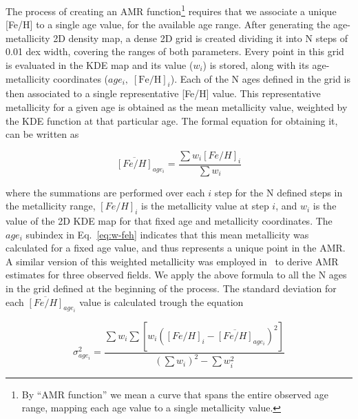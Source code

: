 \documentclass[draft]{aa}
\begin{document}
\begin{appendix}
The process of creating an AMR function\footnote{By ``AMR function'' we mean a
curve that spans the entire observed age range, mapping each age value
to a single metallicity value.} requires that we associate a unique [Fe/H] to a
single age value, for the available age range.
%
After generating the age-metallicity 2D density map, a dense 2D grid is created
dividing it into N steps of 0.01 dex width, covering the ranges of both
parameters. Every point in this grid is evaluated in the KDE map and its value 
($w_{i}$) is stored, along with its age-metallicity coordinates
($age_{i},\;[\mathrm{Fe/H}]_{i}$).
Each of the N ages defined in the grid is then associated to a single
representative [Fe/H] value. This representative metallicity for a given age is
obtained as the mean metallicity value, weighted by the KDE function at that
particular age. The formal equation for obtaining it, can be written as

\begin{equation}
\overline{[Fe/H]}_{age_i}=\frac{\sum w_i {[Fe/H]}_i}{\sum w_i}
\label{eq:w-feh}
\end{equation}

\noindent where the summations are performed over each $i$ step for the N
defined steps in the metallicity range, ${[Fe/H]}_i$ is the metallicity value
at step $i$, and $w_i$ is the value of the 2D KDE map for that fixed age and
metallicity coordinates.
The $age_i$ subindex in Eq.~\ref{eq:w-feh} indicates that this mean
metallicity was calculated for a fixed age value, and thus represents a unique
point in the AMR.\@
A similar version of this weighted metallicity was employed 
in~\citet[][see Eq. 3]{Noel_2009} to derive AMR estimates for three observed
fields.
We apply the above formula to all the N ages in the grid defined at the
beginning of the process. The standard deviation for each $\overline{[Fe/H]}_
{age_i}$ value is calculated trough the equation

\begin{equation}
\sigma_{age_i}^2=\frac{\sum w_i \sum [w_i {({[Fe/H]}_i -
\overline{[Fe/H]}_{age_i})}^2]}{{(\sum w_i)}^2 - \sum w_i^2}
\label{eq:w-std-dev}
\end{equation}


\end{appendix}
\end{document}
